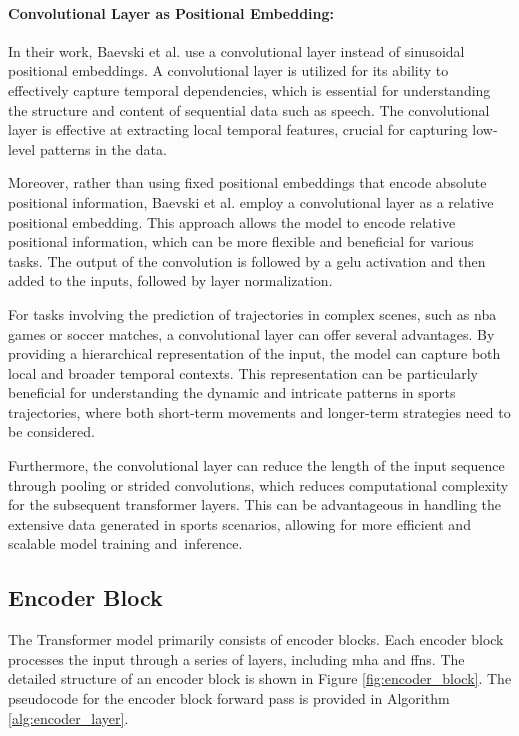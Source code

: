 \paragraph {Convolutional Layer as Positional Embedding:}

In their work, Baevski et al. \cite{baevski2020} use a convolutional layer instead of sinusoidal positional embeddings. A convolutional layer is utilized for its ability to effectively capture temporal dependencies, which is essential for understanding the structure and content of sequential data such as speech. The convolutional layer is effective at extracting local temporal features, crucial for capturing low-level patterns in the data.

Moreover, rather than using fixed positional embeddings that encode absolute positional information, Baevski et al. employ a convolutional layer as a relative positional embedding. This approach allows the model to encode relative positional information, which can be more flexible and beneficial for various tasks. The output of the convolution is followed by a \gls{gelu} activation and then added to the inputs, followed by layer normalization.

For tasks involving the prediction of trajectories in complex scenes, such as \gls{nba} games or soccer matches, a convolutional layer can offer several advantages. By providing a hierarchical representation of the input, the model can capture both local and broader temporal contexts. This representation can be particularly beneficial for understanding the dynamic and intricate patterns in sports trajectories, where both short-term movements and longer-term strategies need to be considered.

Furthermore, the convolutional layer can reduce the length of the input sequence through pooling or strided convolutions, which reduces computational complexity for the subsequent transformer layers. This can be advantageous in handling the extensive data generated in sports scenarios, allowing for more efficient and scalable model training and~inference.



\subsection{Encoder Block}
\label{sec:enc_block}
The Transformer model primarily consists of encoder blocks. Each encoder block processes the input through a series of layers, including \gls{mha} and \glspl{ffn}. The detailed structure of an encoder block is shown in Figure \ref{fig:encoder_block}. The pseudocode for the encoder block forward pass is provided in Algorithm \ref{alg:encoder_layer}.

